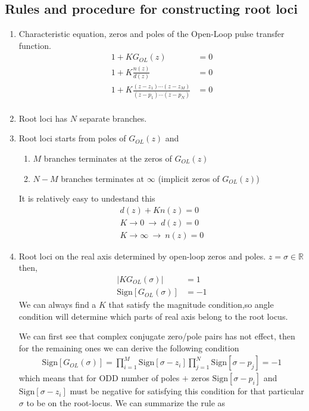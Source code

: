 \documentclass[twoside]{article}
\begin{document}
\subsection*{Rules and procedure for constructing root loci}

\begin{enumerate} 

\item Characteristic equation, zeros and poles of the
  Open-Loop pulse transfer function.
%
\begin{align*}
1 + K G_{OL}(z)  &= 0 \\
1 + K \frac{n(z)}{d(z)} &= 0 \\
1 + K \frac{(z - z_1) \cdots (z - z_M)}{(z - p_1) \cdots (z - p_N)} &= 0 \\
\end{align*}
%

\item Root loci has $N$ separate branches. 

\item Root loci starts from poles of $G_{OL}(z)$ and 
%
\begin{enumerate} 
   \item $M$ branches terminates at the zeros of $G_{OL}(z)$
   \item $N-M$ branches terminates at $\infty$ (implicit zeros of $G_{OL}(z)$)
\end{enumerate}

It is relatively easy to undestand this 
%
\begin{align*}
d(z) + K n(z) = 0 
\\
K \to 0 \ \rightarrow \ d(z) = 0
\\
K \to \infty \ \rightarrow \ n(z) = 0
\end{align*}

\item Root loci on the real axis determined by open-loop zeros and
  poles. $z = \sigma \in \mathbb{R}$ then, 
%
\begin{align*}
| K G_{OL}(\sigma) | &= 1
\\
\mathrm{Sign} [ G_{OL}(\sigma) ] &= -1
\end{align*}
%
We can always find a $K$ that satisfy the magnitude condition,so
angle condition will determine which parts of real axis belong to the
root locus.

We can first see that complex conjugate zero/pole pairs has not effect, then for
the remaining ones we can derive the following condition
%
\begin{align*}
\mathrm{Sign} [ G_{OL}(\sigma) ] = \prod_{i=1}^M  \mathrm{Sign} [\sigma - z_i]
  \prod_{j=1}^N  \mathrm{Sign} [\sigma - p_j] = -1
\end{align*}
%
which means that for ODD number of poles $+$  zeros 
$\mathrm{Sign} [\sigma - p_i ]$ and $\mathrm{Sign} [\sigma - z_i] $ 
must be negative for satisfying this condition for that particular $\sigma$
to be on the root-locus. We can summarize the rule as


\end{enumerate}
\end{document}
